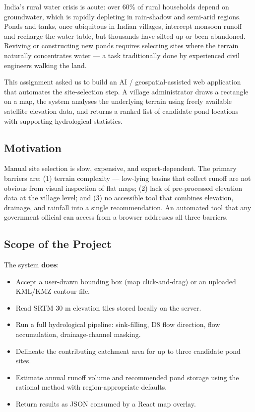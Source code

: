 \documentclass[manuscript,screen,review]{acmart}
\begin{document}
India's rural water crisis is acute: over 60\% of rural households
depend on groundwater, which is rapidly depleting in rain-shadow and
semi-arid regions. Ponds and tanks, once ubiquitous in Indian
villages, intercept monsoon runoff and recharge the water table, but
thousands have silted up or been abandoned. Reviving or constructing
new ponds requires selecting sites where the terrain naturally
concentrates water --- a task traditionally done by experienced civil
engineers walking the land.

This assignment asked us to build an AI / geospatial-assisted web
application that automates the site-selection step. A village
administrator draws a rectangle on a map, the system analyses the
underlying terrain using freely available satellite elevation data,
and returns a ranked list of candidate pond locations with supporting
hydrological statistics.

\subsection{Motivation}

Manual site selection is slow, expensive, and expert-dependent. The
primary barriers are: (1) terrain complexity --- low-lying basins that
collect runoff are not obvious from visual inspection of flat maps;
(2) lack of pre-processed elevation data at the village level; and
(3) no accessible tool that combines elevation, drainage, and rainfall
into a single recommendation. An automated tool that any government
official can access from a browser addresses all three barriers.

\subsection{Scope of the Project}

The system \textbf{does}:
\begin{itemize}
  \item Accept a user-drawn bounding box (map click-and-drag) or an
        uploaded KML/KMZ contour file.
  \item Read SRTM 30 m elevation tiles stored locally on the server.
  \item Run a full hydrological pipeline: sink-filling, D8 flow
        direction, flow accumulation, drainage-channel masking.
  \item Delineate the contributing catchment area for up to three
        candidate pond sites.
  \item Estimate annual runoff volume and recommended pond storage
        using the rational method with region-appropriate defaults.
  \item Return results as JSON consumed by a React map overlay.
\end{itemize}
\end{document}
